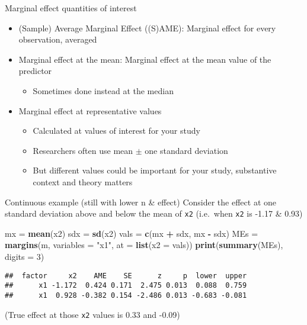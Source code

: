 \documentclass[
  ignorenonframetext,
]{beamer}
\newenvironment{Shaded}{\begin{snugshade}}{\end{snugshade}}
\newcommand{\AttributeTok}[1]{\textcolor[rgb]{0.13,0.29,0.53}{#1}}
\newcommand{\DecValTok}[1]{\textcolor[rgb]{0.00,0.00,0.81}{#1}}
\newcommand{\FunctionTok}[1]{\textcolor[rgb]{0.13,0.29,0.53}{\textbf{#1}}}
\newcommand{\NormalTok}[1]{#1}
\newcommand{\OtherTok}[1]{\textcolor[rgb]{0.56,0.35,0.01}{#1}}
\newcommand{\SpecialCharTok}[1]{\textcolor[rgb]{0.81,0.36,0.00}{\textbf{#1}}}
\newcommand{\StringTok}[1]{\textcolor[rgb]{0.31,0.60,0.02}{#1}}
\providecommand{\tightlist}{%
  \setlength{\itemsep}{0pt}\setlength{\parskip}{0pt}}
\newcommand{\setsep}{\setlength{\itemsep}{3pt}}
\newcommand{\setskip}{\setlength{\parskip}{3pt}}
\renewcommand{\tightlist}{\setsep\setskip}
\begin{document}
\begin{frame}{Marginal effect quantities of interest}
\label{marginal-effect-quantities-of-interest}
\pause

\begin{itemize}[<+->]
\tightlist
\item
  (Sample) Average Marginal Effect ((S)AME): Marginal effect for every observation, averaged
\item
  Marginal effect at the mean: Marginal effect at the mean value of the predictor

  \begin{itemize}[<+->]
  \tightlist
  \item
    Sometimes done instead at the median
  \end{itemize}
\item
  Marginal effect at representative values

  \begin{itemize}[<+->]
  \tightlist
  \item
    Calculated at values of interest for your study
  \item
    Researchers often use mean \(\pm\) one standard deviation
  \item
    But different values could be important for your study, substantive context and theory matters
  \end{itemize}
\end{itemize}
\end{frame}

\begin{frame}[fragile]{Continuous example (still with lower n \& effect)}
\label{continuous-example-still-with-lower-n-effect}
Consider the effect at one standard deviation above and below the mean of \texttt{x2}
(i.e.~when \texttt{x2} is -1.17 \& 0.93)

\pause

\begin{Shaded}
\begin{Highlighting}[]
\NormalTok{mx   }\OtherTok{=} \FunctionTok{mean}\NormalTok{(x2)}
\NormalTok{sdx  }\OtherTok{=} \FunctionTok{sd}\NormalTok{(x2)}
\NormalTok{vals }\OtherTok{=} \FunctionTok{c}\NormalTok{(mx }\SpecialCharTok{+}\NormalTok{ sdx, mx }\SpecialCharTok{{-}}\NormalTok{ sdx)}
\NormalTok{MEs  }\OtherTok{=} \FunctionTok{margins}\NormalTok{(m, }\AttributeTok{variables =} \StringTok{"x1"}\NormalTok{, }\AttributeTok{at =} \FunctionTok{list}\NormalTok{(}\AttributeTok{x2 =}\NormalTok{ vals))}
\FunctionTok{print}\NormalTok{(}\FunctionTok{summary}\NormalTok{(MEs), }\AttributeTok{digits =} \DecValTok{3}\NormalTok{)}
\end{Highlighting}
\end{Shaded}

\begin{verbatim}
##  factor     x2    AME    SE      z     p  lower  upper
##      x1 -1.172  0.424 0.171  2.475 0.013  0.088  0.759
##      x1  0.928 -0.382 0.154 -2.486 0.013 -0.683 -0.081
\end{verbatim}

(True effect at those \texttt{x2} values is 0.33 and -0.09)
\end{frame}
\end{document}
